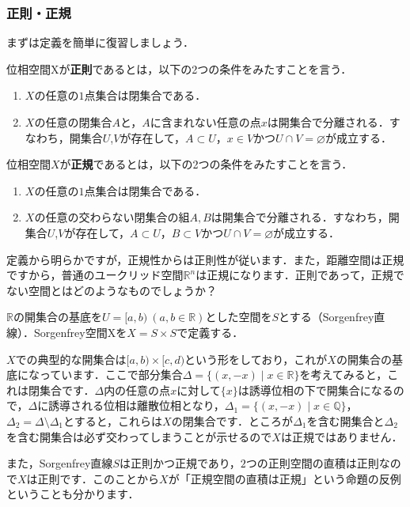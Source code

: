 \subsubsection*{正則・正規}
まずは定義を簡単に復習しましょう．
\begin{defi}[正則空間]
位相空間Xが{\bf 正則}であるとは，以下の2つの条件をみたすことを言う．
\begin{enumerate}
\item $X$の任意の$1$点集合は閉集合である．
\item $X$の任意の閉集合$A$と，$A$に含まれない任意の点$x$は開集合で分離される．すなわち，開集合$U$,$V$が存在して，$A\subset U$，$x\in V$かつ$U\cap V=\varnothing$が成立する．
\end{enumerate}
\end{defi}
\begin{defi}[正規空間]
位相空間$X$が{\bf 正規}であるとは，以下の2つの条件をみたすことを言う．
\begin{enumerate}
\item $X$の任意の$1$点集合は閉集合である．
\item $X$の任意の交わらない閉集合の組$A,B$は開集合で分離される．すなわち，開集合$U$,$V$が存在して，$A\subset U$，$B\subset V$かつ$U\cap V=\varnothing$が成立する．
\end{enumerate}
\end{defi}
定義から明らかですが，正規性からは正則性が従います．また，距離空間は正規ですから，普通のユークリッド空間$\mathbb{R}^n$は正規になります．正則であって，正規でない空間とはどのようなものでしょうか？
\begin{ex}[Sorgenfrey空間]
$\mathbb{R}$の開集合の基底を$U=[a,b)\ (a,b\in\mathbb{R})$とした空間を$S$とする（Sorgenfrey直線）．Sorgenfrey空間Xを$X=S\times S$で定義する．
\end{ex}
$X$での典型的な開集合は$[a,b)\times[c,d)$という形をしており，これが$X$の開集合の基底になっています．ここで部分集合$\Delta=\{(x,-x)\mid x\in\mathbb{R}\}$を考えてみると，これは閉集合です．$\Delta$内の任意の点$x$に対して$\{ x \}$は誘導位相の下で開集合になるので，$\Delta$に誘導される位相は離散位相となり，$\Delta_1=\{(x,-x)\mid x\in\mathbb{Q}\}$，$\Delta_2=\Delta\setminus\Delta_1$とすると，これらは$X$の閉集合です．ところが$\Delta_1$を含む開集合と$\Delta_2$を含む開集合は必ず交わってしまうことが示せるので$X$は正規ではありません．\par
また，Sorgenfrey直線$S$は正則かつ正規であり，$2$つの正則空間の直積は正則なので$X$は正則です．このことから$X$が「正規空間の直積は正規」という命題の反例ということも分かります．\par
